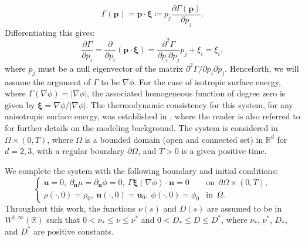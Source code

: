 \documentclass[11pt]{article}
\def\bfxi{\boldsymbol{\xi}}
\begin{document}
\[
\Gamma(\mathbf{p}) = \mathbf{p} \cdot \bfxi \coloneqq p_j \frac{\partial \Gamma(\mathbf{p})}{\partial p_j}.
\]
Differentiating this gives:
\[
\frac{\partial \Gamma}{\partial p_i} = \frac{\partial}{\partial p_i} ( \mathbf{p}\cdot \bfxi) = \frac{\partial^2 \Gamma}{\partial p_i \partial p_j} p_j + \xi_i = \xi_i,
\]
where $p_j$ must be a null eigenvector of the matrix $\partial^2 \Gamma/\partial p_i \partial p_j$. Henceforth, we will assume the argument of $\Gamma$ to be $\nabla \phi$. For the case of isotropic surface energy, where $\Gamma(\nabla \phi) = |\nabla \phi|$, the associated homogeneous function of degree zero is given by $\bfxi = \nabla \phi / |\nabla \phi|$. The thermodynamic consistency for this system, for any anisotropic surface energy, was established in \cite{anderson2000phase, zaidni2024}, where the reader is also referred to for further details on the modeling background. The system is considered in $\Omega \times (0, T)$, where $\Omega$ is a bounded domain (open and connected set) in $\mathbb{R}^d$ for $d = 2,3$, with a regular boundary $\partial \Omega$, and $T > 0$ is a given positive time.

We complete the system with the following boundary and initial conditions:
\[
\begin{cases}
\mathbf{u} = 0,~\partial_{\mathbf{n}} \mu = \partial_{\mathbf{n}} \phi = 0,~\Gamma \bfxi(\nabla \phi) \cdot \mathbf{n} = 0 & \text{on}~~\partial \Omega \times (0, T), \\
\rho(\cdot, 0) = \rho_0,~\mathbf{u}(\cdot, 0) = \mathbf{u}_0,~\phi(\cdot, 0) = \phi_0 & \text{in}~~\Omega.
\end{cases}\label{Boundray_conditionss}
\]
Throughout this work, the functions $\nu(s)$ and $D(s)$ are assumed to be in \( W^{1,\infty}(\mathbb{R}) \) such that \( 0 < \nu_* \leq \nu \leq \nu^* \) and \( 0 < D_* \leq D \leq D^* \), where $\nu_*$, $\nu^*$, $D_*$, and $D^*$ are positive constants.
\end{document}
